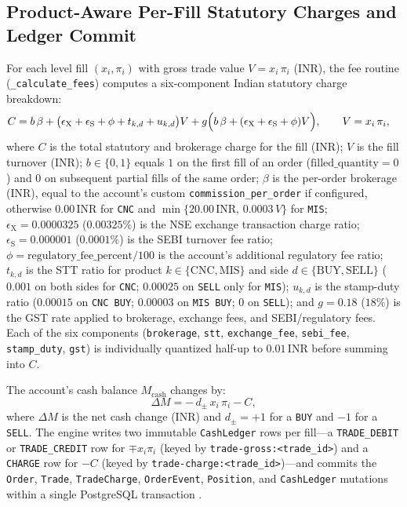 \documentclass[12pt]{article}
\newcommand{\thinunit}[2]{#1\,\text{#2}}
\begin{document}
\subsection{Product-Aware Per-Fill Statutory Charges and Ledger Commit}
For each level fill $(x_i, \pi_i)$ with gross trade value $V = x_i\,\pi_i$ (INR), the fee routine (\texttt{\_calculate\_fees}) computes a six-component Indian statutory charge breakdown:
\begin{equation}
\begin{aligned}
C &= b\,\beta + \bigl(\epsilon_{\mathrm{X}} + \epsilon_{\mathrm{S}} + \phi + t_{k,d} + u_{k,d}\bigr)V + g\Bigl(b\,\beta + (\epsilon_{\mathrm{X}} + \epsilon_{\mathrm{S}} + \phi)V\Bigr),\qquad V = x_i\,\pi_i,
\end{aligned}
\label{eq:charge}
\end{equation}
where $C$ is the total statutory and brokerage charge for the fill (INR); $V$ is the fill turnover (INR); $b\in\{0,1\}$ equals $1$ on the first fill of an order ($\text{filled\_quantity}=0$) and $0$ on subsequent partial fills of the same order; $\beta$ is the per-order brokerage (INR), equal to the account's custom \texttt{commission\_per\_order} if configured, otherwise $\thinunit{0.00}{INR}$ for \texttt{CNC} and $\min\{\thinunit{20.00}{INR},\,0.0003\,V\}$ for \texttt{MIS}; $\epsilon_{\mathrm{X}} = 0.0000325$ ($0.00325\%$) is the NSE exchange transaction charge ratio; $\epsilon_{\mathrm{S}} = 0.000001$ ($0.0001\%$) is the SEBI turnover fee ratio; $\phi = \text{regulatory\_fee\_percent}/100$ is the account's additional regulatory fee ratio; $t_{k,d}$ is the STT ratio for product $k\in\{\mathrm{CNC},\mathrm{MIS}\}$ and side $d\in\{\mathrm{BUY},\mathrm{SELL}\}$ ($0.001$ on both sides for \texttt{CNC}; $0.00025$ on \texttt{SELL} only for \texttt{MIS}); $u_{k,d}$ is the stamp-duty ratio ($0.00015$ on \texttt{CNC BUY}; $0.00003$ on \texttt{MIS BUY}; $0$ on \texttt{SELL}); and $g = 0.18$ ($18\%$) is the GST rate applied to brokerage, exchange fees, and SEBI/regulatory fees. Each of the six components (\texttt{brokerage}, \texttt{stt}, \texttt{exchange\_fee}, \texttt{sebi\_fee}, \texttt{stamp\_duty}, \texttt{gst}) is individually quantized half-up to $\thinunit{0.01}{INR}$ before summing into $C$.

The account's cash balance $M_{\mathrm{cash}}$ changes by:
\begin{equation}
\Delta M = -\,d_{\pm}\,x_i\,\pi_i - C,
\label{eq:cash}
\end{equation}
where $\Delta M$ is the net cash change (INR) and $d_{\pm} = +1$ for a \texttt{BUY} and $-1$ for a \texttt{SELL}. The engine writes two immutable \texttt{CashLedger} rows per fill—a \texttt{TRADE\_DEBIT} or \texttt{TRADE\_CREDIT} row for $\mp x_i\pi_i$ (keyed by \texttt{trade-gross:<trade\_id>}) and a \texttt{CHARGE} row for $-C$ (keyed by \texttt{trade-charge:<trade\_id>})—and commits the \texttt{Order}, \texttt{Trade}, \texttt{TradeCharge}, \texttt{OrderEvent}, \texttt{Position}, and \texttt{CashLedger} mutations within a single PostgreSQL transaction \cite{gray1993}.
\end{document}

